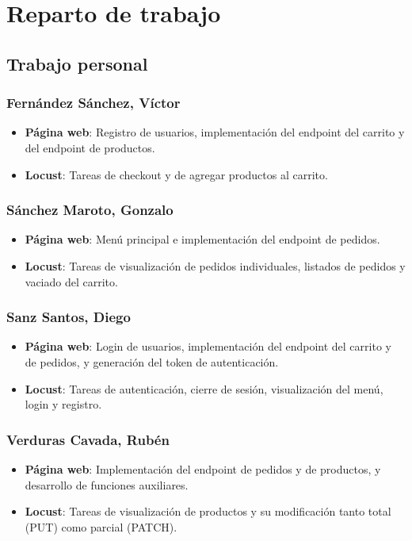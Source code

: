\documentclass[10pt]{book}
\begin{document}
\section{Reparto de trabajo}

\subsection{Trabajo personal}

\subsubsection*{Fernández Sánchez, Víctor}
\begin{itemize}
    \item \textbf{Página web}: Registro de usuarios, implementación del endpoint del carrito y del endpoint de productos.
    \item \textbf{Locust}: Tareas de checkout y de agregar productos al carrito.
\end{itemize}

\subsubsection*{Sánchez Maroto, Gonzalo}
\begin{itemize}
    \item \textbf{Página web}: Menú principal e implementación del endpoint de pedidos.
    \item \textbf{Locust}: Tareas de visualización de pedidos individuales, listados de pedidos y vaciado del carrito.
\end{itemize}

\subsubsection*{Sanz Santos, Diego}
\begin{itemize}
    \item \textbf{Página web}: Login de usuarios, implementación del endpoint del carrito y de pedidos, y generación del token de autenticación.
    \item \textbf{Locust}: Tareas de autenticación, cierre de sesión, visualización del menú, login y registro.
\end{itemize}

\subsubsection*{Verduras Cavada, Rubén}
\begin{itemize}
    \item \textbf{Página web}: Implementación del endpoint de pedidos y de productos, y desarrollo de funciones auxiliares.
    \item \textbf{Locust}: Tareas de visualización de productos y su modificación tanto total (PUT) como parcial (PATCH).
\end{itemize}
\end{document}
